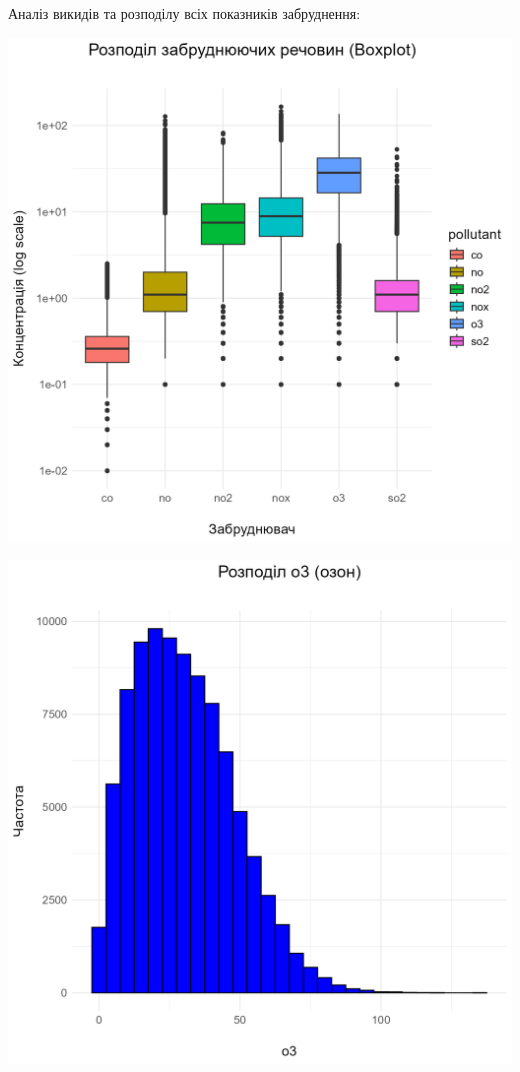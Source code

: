 \documentclass[./report.tex]{subfiles}
\begin{document}
\begin{enumerate}
  Аналіз викидів та розподілу всіх показників забруднення:

  \includegraphics[width=\linewidth]{plots/question2/boxplot_pollutants.png}

  \includegraphics[width=\linewidth]{plots/question2/o3_plot.png}


\end{enumerate}
\end{document}

